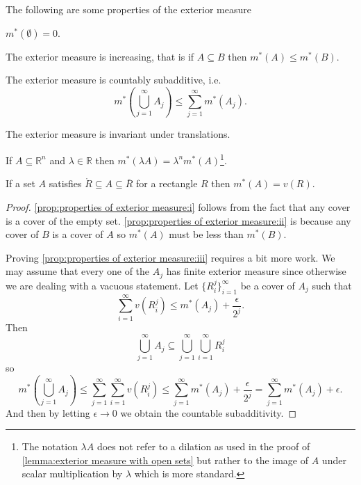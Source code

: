 \documentclass[12pt,oneside]{book}
\newcommand{\locallabel}[1]{\label{\currentprefix:#1}}
\newcommand{\localref}[1]{\ref{\currentprefix:#1}}
\numberwithin{table}{section}
\numberwithin{equation}{section}
\numberwithin{figure}{section}
\newcommand{\R}{\mathbb{R}}
\newcommand{\ext}[1]{m^* \! \left( #1 \right)}
\begin{document}
{
	\def\currentprefix{prop:properties of exterior measure}	
	\begin{proposition} \label{prop:properties of exterior measure}
		The following are some properties of the exterior measure
		\begin{points}
		\item \locallabel{i} \( \ext{\emptyset} = 0 \).
		\item \locallabel{ii} The exterior measure is increasing, that is if \( A \subseteq B \) then \( \ext{A} \leq \ext{B} \). 
		\item \locallabel{iii} The exterior measure is countably subadditive, i.e.
			\begin{equation*}
				\ext{\bigcup_{j = 1}^\infty A_j} \leq \sum_{j = 1}^{\infty} \ext{A_j}. 
			\end{equation*}
		\item \locallabel{iv} The exterior measure is invariant under translations.
		\item \locallabel{v} If \( A \subseteq \R^n \) and \( \lambda \in \R \) then \( \ext{\lambda A} = \lambda^n \ext{A} \)\footnote{The notation \( \lambda A \) does not refer to a dilation as used in the proof of \cref{lemma:exterior measure with open sets} but rather to the image of \( A \) under scalar multiplication by \( \lambda \) which is more standard.}.
		\item \locallabel{vi} If a set \( A \) satisfies \( \mathring{R} \subseteq A \subseteq \bar{R} \) for a rectangle \( R \) then \( \ext{A} = v(R) \).
		\end{points}
	\end{proposition}
	\begin{proof}
		\localref{i} follows from the fact that any cover is a cover of the empty set. \localref{ii} is because any cover of \( B \) is a cover of \( A \) so \( \ext{A} \) must be less than \( \ext{B} \).

		Proving \localref{iii} requires a bit more work. We may assume that every one of the \( A_j \) has finite exterior measure since otherwise we are dealing with a vacuous statement. Let \( \{ R_i^j \}_{i = 1}^\infty \) be a cover of \( A_j \) such that 
		\begin{equation*}
			\sum_{i = 1}^{\infty} v(R_i^j) \leq \ext{A_j} + \frac{\epsilon}{2^j}. 
		\end{equation*}
		Then
		\begin{equation*}
			\bigcup_{j=1}^\infty A_j \subseteq \bigcup_{j=1}^\infty \bigcup_{i=1}^\infty R_i^j
		\end{equation*}
		so
		\begin{equation*}
			\ext{\bigcup_{j=1}^\infty A_j} \leq \sum_{j=1}^\infty \sum_{i=1}^\infty v(R_i^j) \leq \sum_{j = 1}^{\infty} \ext{A_j} + \frac{\epsilon}{2^j} = \sum_{j = 1}^{\infty} \ext{A_j} + \epsilon.
		\end{equation*}
		And then by letting \( \epsilon \to 0 \) we obtain the countable subadditivity.	


\end{proof}}
\end{document}
